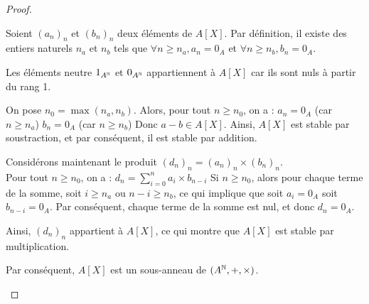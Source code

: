 \documentclass[12pt,a4paper]{report}
\begin{document}
\begin{proof}
    \begin{outline}
        \1 Soient $(a_n)_n$ et $(b_n)_n$ deux éléments de $A[X]$. Par définition, il existe des entiers naturels $n_a$ et $n_b$ tels que $\forall n \ge n_a, a_n = 0_A$ et $\forall n \ge n_b, b_n = 0_A$.

        \1 Les éléments neutre $1_{A^{\mathbb{N}}}$ et $0_{A^{\mathbb{N}}}$ appartiennent à $A[X]$ car ils sont nuls à partir du rang 1.

        \1 On pose $n_0 = \max(n_a, n_b)$. Alors, pour tout $n \ge n_0$, on a :
            \2 $a_n = 0_A$ (car $n \ge n_a$)
            \2 $b_n = 0_A$ (car $n \ge n_b$)
            \2 Donc $a-b \in A[X]$.
        \1 Ainsi, $A[X]$ est stable par soustraction, et par conséquent, il est stable par addition.

        \1 Considérons maintenant le produit $(d_n)_n = (a_n)_n \times (b_n)_n$.\\Pour tout $n \ge n_0$, on a :
            \2 $d_n = \sum_{i=0}^{n} a_i \times b_{n-i}$
            \2 Si $n \ge n_0$, alors pour chaque terme de la somme, soit $i \ge n_a$ ou $n-i \ge n_b$, ce qui implique que soit $a_i = 0_A$ soit $b_{n-i} = 0_A$. Par conséquent, chaque terme de la somme est nul, et donc $d_n = 0_A$.

        \1 Ainsi, $(d_n)_n$ appartient à $A[X]$, ce qui montre que $A[X]$ est stable par multiplication.

        \1 Par conséquent, $A[X]$ est un sous-anneau de $(A^{\mathbb{N}}, +, \times)$.
    \end{outline}
\end{proof}
\end{document}
